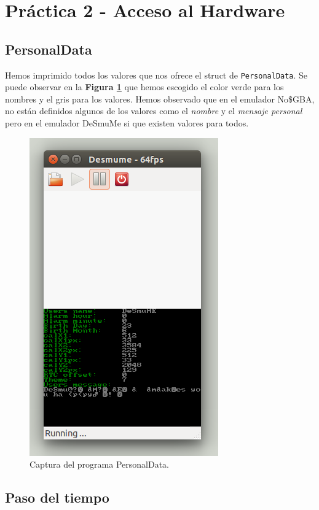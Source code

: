 
\section{Práctica 2 - Acceso al Hardware}

\subsection{PersonalData}

Hemos imprimido todos los valores que nos ofrece el struct de {\tt PersonalData}. Se puede observar en la \textbf{Figura \ref{s1}} que hemos escogido el color verde para los nombres y el gris para los valores. Hemos observado que en el emulador No\$GBA, no están definidos algunos de los valores como el \emph{nombre} y el \emph{mensaje personal} pero en el emulador DeSmuMe si que existen valores para todos.

\begin{figure}[H] 
\centering
\includegraphics[scale=0.75]{P2Media/personaldata.png}
\caption{Captura del programa PersonalData.}
\label{s1}
\end{figure}
  
\newpage
  
\subsection{Paso del tiempo}

